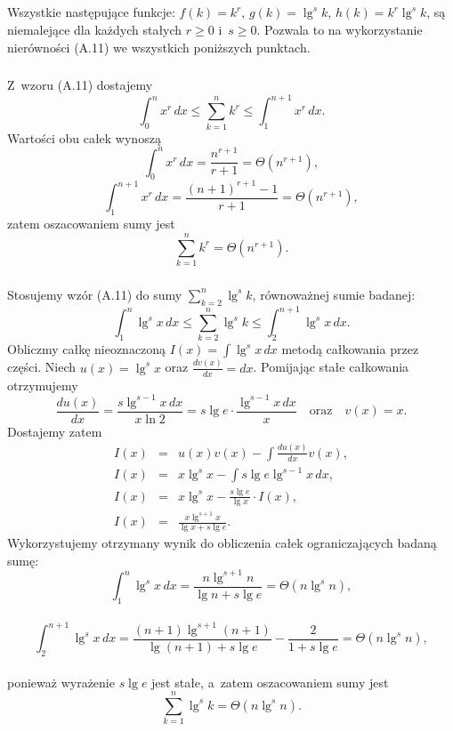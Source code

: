 \problems

\subsection{} %
Wszystkie następujące funkcje: $f(k)=k^r$, $g(k)=\lg^sk$, $h(k)=k^r\lg^sk$, są niemalejące dla każdych stałych $r\ge 0$ i~$s\ge 0$. Pozwala to na wykorzystanie nierówności (A.11) we wszystkich poniższych punktach.

\subsubsection{} %
Z~wzoru (A.11) dostajemy
\[
	\int_0^nx^r\,dx\le\sum_{k=1}^nk^r\le\int_1^{n+1}x^r\,dx.
\]
Wartości obu całek wynoszą
\[
	\int_0^nx^r\,dx = \frac{n^{r+1}}{r+1} = \Theta(n^{r+1}),
\]
\[
	\int_1^{n+1}x^r\,dx = \frac{(n+1)^{r+1}-1}{r+1} = \Theta(n^{r+1}),
\]
zatem oszacowaniem sumy jest
\[
	\sum_{k=1}^nk^r = \Theta(n^{r+1}).
\]

\subsubsection{} %
Stosujemy wzór (A.11) do sumy $\sum_{k=2}^n\lg^sk$, równoważnej sumie badanej:
\[
	\int_1^n\lg^sx\,dx\le\sum_{k=2}^n\lg^sk\le\int_2^{n+1}\lg^sx\,dx.
\]
Obliczmy całkę nieoznaczoną $I(x) = \int\lg^sx\,dx$ metodą całkowania przez części. Niech $u(x)=\lg^sx$ oraz $\frac{dv(x)}{dx}=dx$. Pomijając stałe całkowania otrzymujemy
\[
	\frac{du(x)}{dx} = \frac{s\lg^{s-1}x\,dx}{x\ln 2} = s\lg e\cdot\frac{\lg^{s-1}x\,dx}{x}\quad\mbox{oraz}\quad v(x)=x.
\]
Dostajemy zatem
\begin{eqnarray*}
	I(x) &=& u(x)v(x)-\int\frac{du(x)}{dx}v(x), \\
	I(x) &=& x\lg^sx-\int s\lg e\lg^{s-1}x\,dx, \\
	I(x) &=& x\lg^sx-\frac{s\lg e}{\lg x}\cdot I(x), \\
	I(x) &=& \frac{x\lg^{s+1}x}{\lg x+s\lg e}.
\end{eqnarray*}
Wykorzystujemy otrzymany wynik do obliczenia całek ograniczających badaną sumę:
\[
	{\displaystyle \int_1^n\lg^sx\,dx} = \dfrac{n\lg^{s+1}n}{\lg n+s\lg e} = \Theta(n\lg^sn),
\]
\\
\[
	{\displaystyle \int_2^{n+1}\lg^sx\,dx} = \dfrac{(n+1)\lg^{s+1}(n+1)}{\lg (n+1)+s\lg e}-\dfrac{2}{1+s\lg e} = \Theta(n\lg^sn),
\]
\\
ponieważ wyrażenie $s\lg e$ jest stałe, a~zatem oszacowaniem sumy jest
\[
	\sum_{k=1}^n\lg^sk = \Theta(n\lg^sn).
\]

